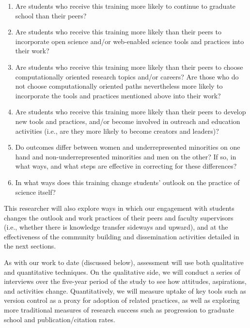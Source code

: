 \documentclass{proposalnsf}
\newlength{\up}
\begin{document}
\begin{enumerate}

\item
  Are students who receive this training more likely to continue to
  graduate school than their peers?

\item
  Are students who receive this training more likely than their peers
  to incorporate open science and/or web-enabled science tools and
  practices into their work?

\item
  Are students who receive this training more likely than their peers
  to choose computationally oriented research topics and/or careers?
  Are those who do not choose computationally oriented paths
  nevertheless more likely to incorporate the tools and practices
  mentioned above into their work?

\item
  Are students who receive this training more likely than their peers
  to develop new tools and practices, and/or become involved in
  outreach and education activities (i.e., are they more likely to
  become creators and leaders)?

\item
  Do outcomes differ between women and underrepresented minorities on
  one hand and non-underrepresented minorities and men on the other?
  If so, in what ways, and what steps are effective in correcting for
  these differences?

\item
  In what ways does this training change students' outlook on the
  practice of science itself?

\end{enumerate}

This researcher will also explore ways in which our engagement with
students changes the outlook and work practices of their peers and
faculty supervisors (i.e., whether there is knowledge transfer
sideways and upward), and at the effectiveness of the community
building and dissemination activities detailed in the next sections.

As with our work to date (discussed below), assessment will use both
qualitative and quantitative techniques.  On the qualitative side, we
will conduct a series of interviews over the five-year period of the
study to see how attitudes, aspirations, and activities change.
Quantitatively, we will measure uptake of key tools such as version
control as a proxy for adoption of related practices, as well as
exploring more traditional measures of research success such as
progression to graduate school and publication/citation rates.
\end{document}
